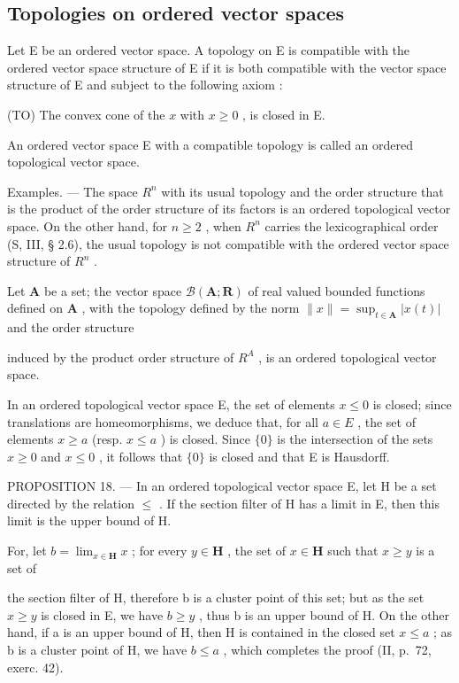 \subsection{Topologies on ordered vector spaces}

Let E be an ordered vector space. A topology on E is compatible with the ordered vector space structure of E if it is both compatible with the vector space structure of E and subject to the following axiom :

(TO) The convex cone of the \(x\) with \(x \geqslant 0\) , is closed in E.

An ordered vector space E with a compatible topology is called an ordered topological vector space.

Examples. --- The space \(R^{n}\) with its usual topology and the order structure that is the product of the order structure of its factors is an ordered topological vector space. On the other hand, for \(n \geqslant 2\) , when \(R^{n}\) carries the lexicographical order (S, III, § 2.6), the usual topology is not compatible with the ordered vector space structure of \(R^{n}\) .

Let \(\mathbf{A}\) be a set; the vector space \(\mathcal{B}(\mathbf{A};\mathbf{R})\) of real valued bounded functions defined on \(\mathbf{A}\) , with the topology defined by the norm \(\| x\| = \sup_{t\in \mathbf{A}}|x(t)|\) and the order structure

induced by the product order structure of \(R^{A}\) , is an ordered topological vector space.

In an ordered topological vector space E, the set of elements \(x \leqslant 0\) is closed; since translations are homeomorphisms, we deduce that, for all \(a \in E\) , the set of elements \(x \geqslant a\) (resp. \(x \leqslant a\) ) is closed. Since \(\{0\}\) is the intersection of the sets \(x \geqslant 0\) and \(x \leqslant 0\) , it follows that \(\{0\}\) is closed and that E is Hausdorff.

PROPOSITION 18. --- In an ordered topological vector space E, let H be a set directed by the relation \(\leqslant\) . If the section filter of H has a limit in E, then this limit is the upper bound of H.

For, let \(b = \lim_{x\in \mathbf{H}}x\) ; for every \(y\in \mathbf{H}\) , the set of \(x\in \mathbf{H}\) such that \(x\geqslant y\) is a set of

the section filter of H, therefore b is a cluster point of this set; but as the set \(x \geqslant y\) is closed in E, we have \(b \geqslant y\) , thus b is an upper bound of H. On the other hand, if a is an upper bound of H, then H is contained in the closed set \(x \leqslant a\) ; as b is a cluster point of H, we have \(b \leqslant a\) , which completes the proof (II, p.~72, exerc. 42).

